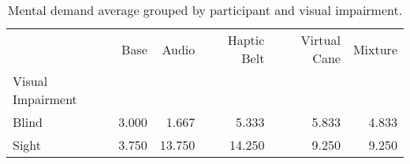
\begin{table}[!htb]
\centering
\caption{Mental demand average grouped by participant and visual impairment.}
\label{tab:md_average_group}
\begin{tabular}{lrrrrr}
\toprule
{} &  Base &  Audio &  Haptic Belt &  Virtual Cane &  Mixture \\
Visual Impairment &       &        &              &               &          \\
\midrule
Blind             & 3.000 &  1.667 &        5.333 &         5.833 &    4.833 \\
Sight             & 3.750 & 13.750 &       14.250 &         9.250 &    9.250 \\
\bottomrule
\end{tabular}
\end{table}


